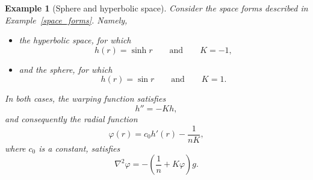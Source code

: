 \documentclass[reqno,11pt]{amsart}
\numberwithin{equation}{section}  %
\newtheorem{example}[theorem]{Example}
\newtheorem{remark}[theorem]{Remark}
\begin{document}
\begin{example}[Sphere and hyperbolic space]\label{ex:space_forms_phi}
Consider the space forms described in Example~\ref{space_forms}. Namely,
\begin{itemize}
    \item the hyperbolic space, for which
    \[
    h(r)=\sinh r
    \qquad \text{and} \qquad K=-1,
    \]
    
    \item and the sphere, for which
    \[
    h(r)=\sin r
    \qquad \text{and} \qquad K=1.
    \]
\end{itemize}

In both cases, the warping function satisfies
\[
h''=-Kh,
\]
and consequently the radial function
\[
\varphi(r)=c_{0}h'(r)-\frac{1}{nK},
\]
where $c_{0}$ is a constant, satisfies
\[
\nabla^{2}\varphi
=
-\left(\frac{1}{n}+K\varphi\right)g.
\]
\end{example}

\end{document}
